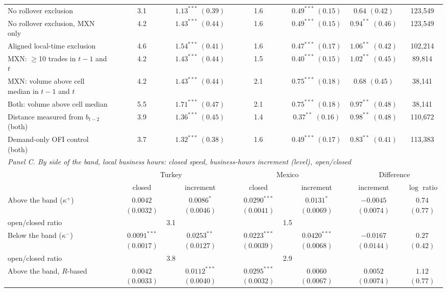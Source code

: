 \begin{tabular}{lcccccc}
No rollover exclusion & 3.1 & $1.13^{***}$ $(0.39)$ & 1.6 & $0.49^{***}$ $(0.15)$ & $0.64$ $(0.42)$ & 123,549 \\
No rollover exclusion, MXN only & 4.2 & $1.43^{***}$ $(0.44)$ & 1.6 & $0.49^{***}$ $(0.15)$ & $0.94^{**}$ $(0.46)$ & 123,549 \\
Aligned local-time exclusion & 4.6 & $1.54^{***}$ $(0.41)$ & 1.6 & $0.47^{***}$ $(0.17)$ & $1.06^{**}$ $(0.42)$ & 102,214 \\
MXN: $\geq$10 trades in $t-1$ and $t$ & 4.2 & $1.43^{***}$ $(0.44)$ & 1.5 & $0.40^{***}$ $(0.15)$ & $1.02^{**}$ $(0.45)$ & 89,814 \\
MXN: volume above cell median in $t-1$ and $t$ & 4.2 & $1.43^{***}$ $(0.44)$ & 2.1 & $0.75^{***}$ $(0.18)$ & $0.68$ $(0.45)$ & 38,141 \\
Both: volume above cell median & 5.5 & $1.71^{***}$ $(0.47)$ & 2.1 & $0.75^{***}$ $(0.18)$ & $0.97^{**}$ $(0.48)$ & 38,141 \\
Distance measured from $b_{t-2}$ (both) & 3.9 & $1.36^{***}$ $(0.45)$ & 1.4 & $0.37^{**}$ $(0.16)$ & $0.98^{**}$ $(0.48)$ & 110,672 \\
Demand-only OFI control (both) & 3.7 & $1.32^{***}$ $(0.38)$ & 1.6 & $0.49^{***}$ $(0.17)$ & $0.83^{**}$ $(0.41)$ & 113,383 \\
\midrule
\multicolumn{7}{l}{\emph{Panel C. By side of the band, local business hours: closed speed, business-hours increment (level), open/closed}} \\
 & \multicolumn{2}{c}{Turkey} & \multicolumn{2}{c}{Mexico} & \multicolumn{2}{c}{Difference} \\
\cmidrule(lr){2-3}\cmidrule(lr){4-5}\cmidrule(lr){6-7}
 & closed & increment & closed & increment & increment & $\log$ ratio \\
\midrule
Above the band ($\kappa^+$) & $0.0042$ $(0.0032)$ & $0.0086^{*}$ $(0.0046)$ & $0.0290^{***}$ $(0.0041)$ & $0.0131^{*}$ $(0.0069)$ & $-0.0045$ $(0.0074)$ & $0.74$ $(0.77)$ \\
\quad open/closed ratio & \multicolumn{2}{c}{3.1} & \multicolumn{2}{c}{1.5} & & \\
Below the band ($\kappa^-$) & $0.0091^{***}$ $(0.0017)$ & $0.0253^{**}$ $(0.0127)$ & $0.0223^{***}$ $(0.0039)$ & $0.0420^{***}$ $(0.0068)$ & $-0.0167$ $(0.0144)$ & $0.27$ $(0.42)$ \\
\quad open/closed ratio & \multicolumn{2}{c}{3.8} & \multicolumn{2}{c}{2.9} & & \\
Above the band, $R$-based & $0.0042$ $(0.0033)$ & $0.0112^{***}$ $(0.0040)$ & $0.0295^{***}$ $(0.0032)$ & $0.0060$ $(0.0067)$ & $0.0052$ $(0.0074)$ & $1.12$ $(0.77)$ \\

\end{tabular}
